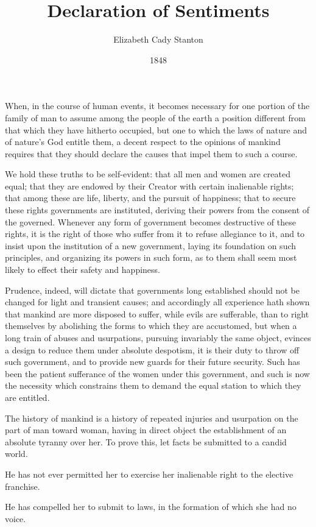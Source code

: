 \documentclass{article}
\title{Declaration of Sentiments}
\author{Elizabeth Cady Stanton}
\date{1848}
\begin{document}
\maketitle

When, in the course of human events, it becomes necessary for one portion of
the family of man to assume among the people of the earth a position different
from that which they have hitherto occupied, but one to which the laws of
nature and of nature's God entitle them, a decent respect to the opinions of
mankind requires that they should declare the causes that impel them to such a
course.

We hold these truths to be self-evident: that all men and women are created
equal; that they are endowed by their Creator with certain inalienable rights;
that among these are life, liberty, and the pursuit of happiness; that to
secure these rights governments are instituted, deriving their powers from the
consent of the governed. Whenever any form of government becomes destructive of
these rights, it is the right of those who suffer from it to refuse allegiance
to it, and to insist upon the institution of a new government, laying its
foundation on such principles, and organizing its powers in such form, as to
them shall seem most likely to effect their safety and happiness.

Prudence, indeed, will dictate that governments long established should not be
changed for light and transient causes; and accordingly all experience hath
shown that mankind are more disposed to suffer, while evils are sufferable,
than to right themselves by abolishing the forms to which they are accustomed,
but when a long train of abuses and usurpations, pursuing invariably the same
object, evinces a design to reduce them under absolute despotism, it is their
duty to throw off such government, and to provide new guards for their future
security. Such has been the patient sufferance of the women under this
government, and such is now the necessity which constrains them to demand the
equal station to which they are entitled.

The history of mankind is a history of repeated injuries and usurpation on the
part of man toward woman, having in direct object the establishment of an
absolute tyranny over her. To prove this, let facts be submitted to a candid
world.

He has not ever permitted her to exercise her inalienable right to the elective
franchise.

He has compelled her to submit to laws, in the formation of which she had no
voice.
\end{document}
